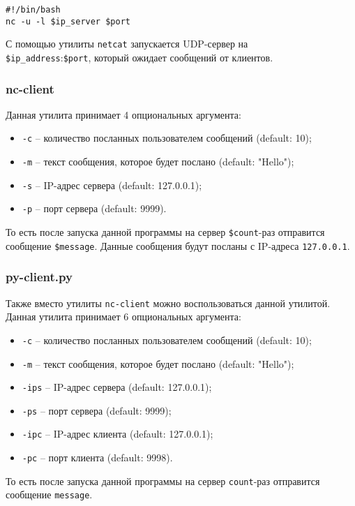 \begin{lstlisting}
#!/bin/bash
nc -u -l $ip_server $port
\end{lstlisting}
С помощью утилиты \verb|netcat| запускается UDP-сервер на\\
\verb|$ip_address|:\verb|$port|, который ожидает сообщений от клиентов.

\subsubsection{nc-client}

Данная утилита принимает 4 опциональных аргумента:
\begin{itemize}
    \item \verb|-c| -- количество посланных пользователем сообщений \footnotesize(default: 10)\normalsize;
    \item \verb|-m| -- текст сообщения, которое будет послано \footnotesize(default: "Hello")\normalsize;
    \item \verb|-s| -- IP-адрес сервера \footnotesize(default: 127.0.0.1)\normalsize;
    \item \verb|-p| -- порт сервера \footnotesize(default: 9999)\normalsize.
\end{itemize}
То есть после запуска данной программы на сервер \verb|$count|-раз отправится сообщение \verb|$message|. Данные сообщения будут посланы с IP-адреса \verb|127.0.0.1|.

\subsubsection{py-client.py}

Также вместо утилиты \verb|nc-client| можно воспользоваться данной утилитой. Данная утилита принимает 6 опциональных аргумента:
\begin{itemize}
    \item \verb|-c| -- количество посланных пользователем сообщений \footnotesize(default: 10)\normalsize;
    \item \verb|-m| -- текст сообщения, которое будет послано \footnotesize(default: "Hello")\normalsize;
    \item \verb|-ips| -- IP-адрес сервера \footnotesize(default: 127.0.0.1)\normalsize;
    \item \verb|-ps| -- порт сервера \footnotesize(default: 9999)\normalsize;
    \item \verb|-ipc| -- IP-адрес клиента \footnotesize(default: 127.0.0.1)\normalsize;
    \item \verb|-pc| -- порт клиента \footnotesize(default: 9998)\normalsize.
\end{itemize}
То есть после запуска данной программы на сервер \verb|count|-раз отправится сообщение \verb|message|.

